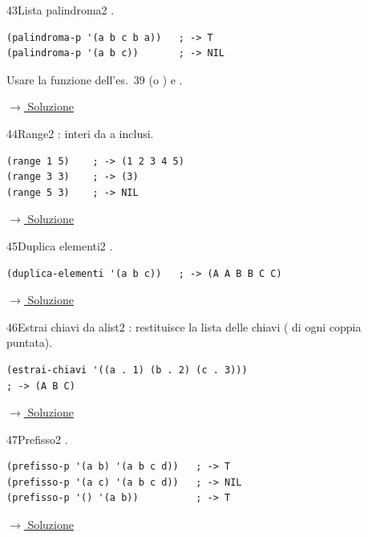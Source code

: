 \label{ex:43}
\begin{colbox}{43}{Lista palindroma}{2}
 .
\nopagebreak
\begin{lstlisting}
(palindroma-p '(a b c b a))   ; -> T
(palindroma-p '(a b c))       ; -> NIL
\end{lstlisting}
Usare la funzione  dell'es.~39 (o ) e .


\small\color{black!55}\hyperref[sol:43]{$\rightarrow$ Soluzione}\normalsize\color{black}
\end{colbox}

\label{ex:44}
\begin{stdbox}{44}{Range}{2}
 : interi da  a  inclusi.
\nopagebreak
\begin{lstlisting}
(range 1 5)    ; -> (1 2 3 4 5)
(range 3 3)    ; -> (3)
(range 5 3)    ; -> NIL
\end{lstlisting}


\small\color{black!55}\hyperref[sol:44]{$\rightarrow$ Soluzione}\normalsize\color{black}
\end{stdbox}

\label{ex:45}
\begin{colbox}{45}{Duplica elementi}{2}
 .
\nopagebreak
\begin{lstlisting}
(duplica-elementi '(a b c))   ; -> (A A B B C C)
\end{lstlisting}


\small\color{black!55}\hyperref[sol:45]{$\rightarrow$ Soluzione}\normalsize\color{black}
\end{colbox}

\label{ex:46}
\begin{colbox}{46}{Estrai chiavi da alist}{2}
 : restituisce la
lista delle chiavi ( di ogni coppia puntata).
\begin{lstlisting}
(estrai-chiavi '((a . 1) (b . 2) (c . 3)))
; -> (A B C)
\end{lstlisting}


\small\color{black!55}\hyperref[sol:46]{$\rightarrow$ Soluzione}\normalsize\color{black}
\end{colbox}

\label{ex:47}
\begin{colbox}{47}{Prefisso}{2}
 .
\nopagebreak
\begin{lstlisting}
(prefisso-p '(a b) '(a b c d))   ; -> T
(prefisso-p '(a c) '(a b c d))   ; -> NIL
(prefisso-p '() '(a b))          ; -> T
\end{lstlisting}


\small\color{black!55}\hyperref[sol:47]{$\rightarrow$ Soluzione}\normalsize\color{black}
\end{colbox}

